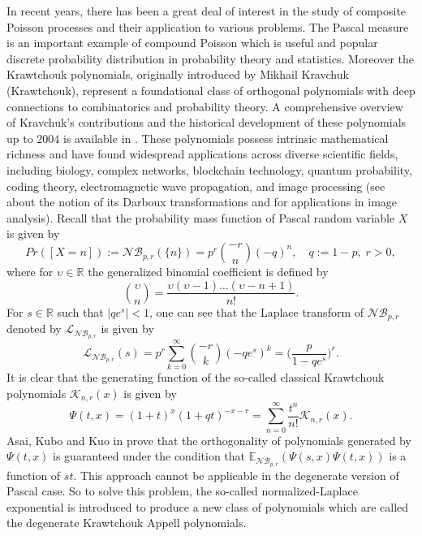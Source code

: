 \documentclass{birkjour}
\theoremstyle{definition}
\theoremstyle{remark}
\numberwithin{equation}{section}
\begin{document}
In recent years, there has been a great deal of interest in the
study of composite Poisson processes and their application to
various problems. The Pascal measure is an important example of
compound Poisson which is useful and popular discrete probability
distribution in probability theory and statistics. Moreover the
Krawtchouk polynomials, originally introduced by Mikhail Kravchuk
(Krawtchouk), represent a foundational class of orthogonal
polynomials with deep connections to combinatorics and probability
theory. A comprehensive overview of Kravchuk's contributions and the
historical development of these polynomials up to $2004$ is
available in \cite{[vk04]}. These polynomials possess intrinsic
mathematical richness and have found widespread applications across
diverse scientific fields, including biology, complex networks,
blockchain technology, quantum probability, coding theory,
electromagnetic wave propagation, and image processing (see
\cite{[mtv23]} about the notion of its Darboux transformations and
\cite{[yp03]} for applications in image analysis). Recall that the
probability mass function of Pascal random variable $X$ is given by
$$
Pr([X=n]):=\mathcal{NB}_{p,r}(\{n\})=p^{r}\binom{-r}{n}(-q)^n, \quad
q :=1-p, \; r>0,
$$
where for $\upsilon\in \mathbb{R}$ the generalized binomial
coefficient is defined by
$$
\binom{\upsilon}{n}=\frac{\upsilon(\upsilon-1)\ldots(\upsilon-n+1)}{n!}.
$$
For $s\in \mathbb{R}$ such that $|qe^{s}|<1$, one can see that the
Laplace transform of $\mathcal{N}\mathcal{B}_{p, r}$ denoted by
$\mathcal{L}_{\mathcal{N}\mathcal{B}_{p, r}}$ is given by
\begin{equation}\label{Laplace-Pascal}
\mathcal{L}_{\mathcal{N}\mathcal{B}_{p, r}}(s)
=\displaystyle{p^{r}\sum^{\infty}_{k=0}\binom{-r}{k}(-qe^{s})^{k}=\Big(\frac{p}{1-qe^{s}}\Big)^{r}}.
\end{equation}
It is clear that the generating function of the so-called classical
Krawtchouk polynomials $\mathcal{K}_{n, r}(x)$ is given by
\begin{equation}\label{Generating-Pascal}
\Psi(t,
x)=\displaystyle{(1+t)^{x}(1+qt)^{-x-r}=\sum^{\infty}_{n=0}\frac{t^{n}}{n!}\mathcal{K}_{n,
r}(x)}.
\end{equation}
Asai, Kubo and Kuo in \cite{[acc03]} prove that the orthogonality of
polynomials generated by $\Psi(t, x)$ is guaranteed under the
condition that $\mathbb{E}_{\mathcal{NB}_{p, r}}(\Psi(s, x)\Psi(t,
x))$ is a function of $st$. This approach cannot be applicable in
the degenerate version of Pascal case. So to solve this problem, the
so-called normalized-Laplace exponential is introduced to produce a
new class of polynomials which are called the degenerate Krawtchouk
Appell polynomials.
\end{document}

